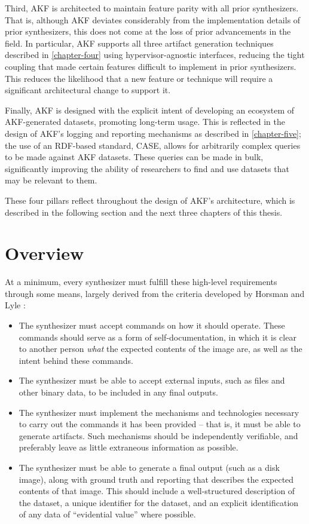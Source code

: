\documentclass[letterpaper,12pt]{report}
\def\tightlist{}
\begin{document}
Third, AKF is architected to maintain feature parity with all prior
synthesizers. That is, although AKF deviates considerably from the
implementation details of prior synthesizers, this does not come at the
loss of prior advancements in the field. In particular, AKF supports all
three artifact generation techniques described in \autoref{chapter-four} using hypervisor-agnostic interfaces, reducing the tight
coupling that made certain features difficult to implement in prior
synthesizers. This reduces the likelihood that a new feature or
technique will require a significant architectural change to support it.

Finally, AKF is designed with the explicit intent of developing an
ecosystem of AKF-generated datasets, promoting long-term usage. This is
reflected in the design of AKF's logging and reporting mechanisms as
described in \autoref{chapter-five}; the use of an
RDF-based standard, CASE, allows for arbitrarily complex queries to be
made against AKF datasets. These queries can be made in bulk,
significantly improving the ability of researchers to find and use
datasets that may be relevant to them.

These four pillars reflect throughout the design of AKF's architecture,
which is described in the following section and the next three chapters
of this thesis.

\section{Overview}\label{overview}

At a minimum, every synthesizer must fulfill these high-level
requirements through some means, largely derived from the criteria
developed by Horsman and Lyle
\cite{horsmanDatasetConstructionChallenges2021}:

\begin{itemize}
\tightlist
\item
  The synthesizer must accept commands on how it should operate. These
  commands should serve as a form of self-documentation, in which it is
  clear to another person \emph{what} the expected contents of the image
  are, as well as the intent behind these commands.
\item
  The synthesizer must be able to accept external inputs, such as files
  and other binary data, to be included in any final outputs.
\item
  The synthesizer must implement the mechanisms and technologies
  necessary to carry out the commands it has been provided -- that is,
  it must be able to generate artifacts. Such mechanisms should be
  independently verifiable, and preferably leave as little extraneous
  information as possible.
\item
  The synthesizer must be able to generate a final output (such as a
  disk image), along with ground truth and reporting that describes the
  expected contents of that image. This should include a well-structured
  description of the dataset, a unique identifier for the dataset, and
  an explicit identification of any data of ``evidential value'' where
  possible.
\end{itemize}
\end{document}
